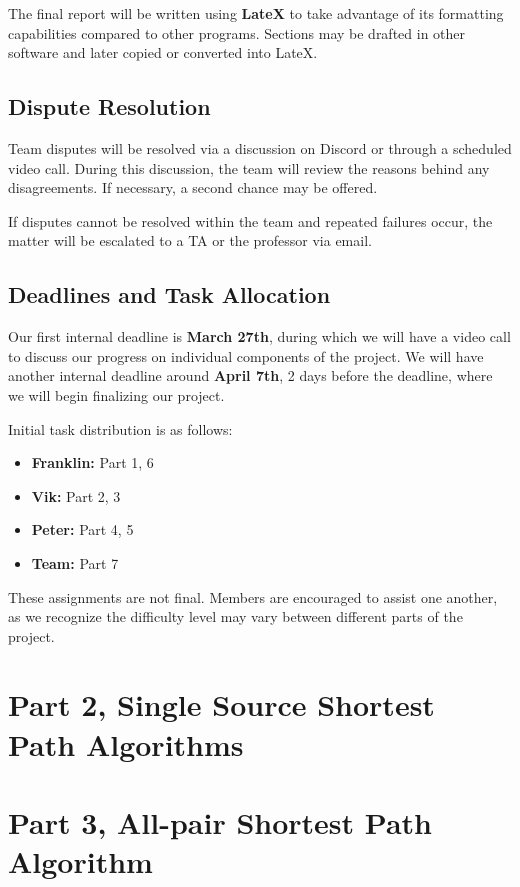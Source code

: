 \documentclass{article}
\begin{document}
\begin{onehalfspace}
{The final report will be written using \textbf{LateX} to take advantage of its formatting capabilities compared to other programs. Sections may be drafted in other software and later copied or converted into LateX.

\subsection*{Dispute Resolution}

Team disputes will be resolved via a discussion on Discord or through a scheduled video call. During this discussion, the team will review the reasons behind any disagreements. If necessary, a second chance may be offered. 

If disputes cannot be resolved within the team and repeated failures occur, the matter will be escalated to a TA or the professor via email.

\subsection*{Deadlines and Task Allocation}

Our first internal deadline is \textbf{March 27th}, during which we will have a video call to discuss our progress on individual components of the project. We will have another internal deadline around \textbf{April 7th}, 2 days before the deadline, where we will begin finalizing our project.

Initial task distribution is as follows:

\begin{itemize}[leftmargin=1.5cm]
    \item \textbf{Franklin:} Part 1, 6
    \item \textbf{Vik:} Part 2, 3
    \item \textbf{Peter:} Part 4, 5
    \item \textbf{Team:} Part 7
\end{itemize}

These assignments are not final. Members are encouraged to assist one another, as we recognize the difficulty level may vary between different parts of the project.}
\newpage

\section*{Part 2, Single Source Shortest Path Algorithms}
\newpage

\section*{Part 3, All-pair Shortest Path Algorithm}
\newpage


\end{onehalfspace}
\end{document}
